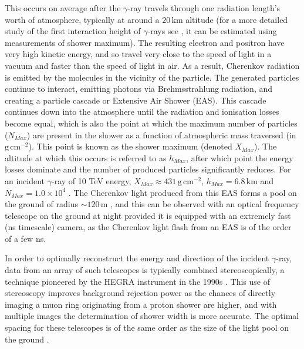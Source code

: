 This occurs on average after the $\gamma$-ray travels through one radiation length's worth of atmosphere, typically at around a $\mathrm{20\,km}$ altitude \cite{weekesgamma} (for a more detailed study of the first interaction height of $\gamma$-rays see \cite{Sitarek1i}, it can be estimated using measurements of shower maximum). The resulting electron and positron have very high kinetic energy, and so travel very close to the speed of light in a vacuum and faster than the speed of light in air. As a result, Cherenkov radiation is emitted by the molecules in the vicinity of the particle. The generated particles continue to interact, emitting photons via Brehmsstrahlung radiation, and creating a particle cascade or Extensive Air Shower (EAS). This cascade continues down into the atmosphere until the radiation and ionisation losses become equal, which is also the point at which the maximum number of particles ($N_{Max}$) are present in the shower as a function of atmospheric mass traversed (in $\mathrm{g\,cm^{-2}}$). This point is known as the shower maximum (denoted $X_{Max}$). The altitude at which this occurs is referred to as $h_{Max}$, after which point the energy losses dominate and the number of produced particles significantly reduces. For an incident $\gamma$-ray of 10 TeV energy, $X_{Max}\approx \mathrm{431\,g\,cm^{-2}}$, $h_{Max}=\mathrm{6.8\,km}$ and $N_{Max}=\mathrm{1.0 \times 10^4}$ \cite{weekesgamma}.  The Cherenkov light produced from this EAS forms a pool on the ground of radius $\sim\mathrm{120\,m}$ \cite{weekesgamma}, and this can be observed with an optical frequency telescope on the ground at night provided it is equipped with an extremely fast (ns timescale) camera, as the Cherenkov light flash from an 
EAS is of the order of a few ns. 

In order to optimally reconstruct the energy and direction of the incident $\gamma$-ray, data from an array of such telescopes is typically combined stereoscopically, a technique pioneered by the HEGRA instrument in the 1990s \cite{HEGRA}. This use of stereoscopy improves background rejection power as the chances of directly imaging a muon ring originating from a proton shower are higher, and with multiple images the determination of shower width is more accurate.  The optimal spacing for these telescopes is of the same order as the size of the light pool on the ground \cite{weekesgamma}.

